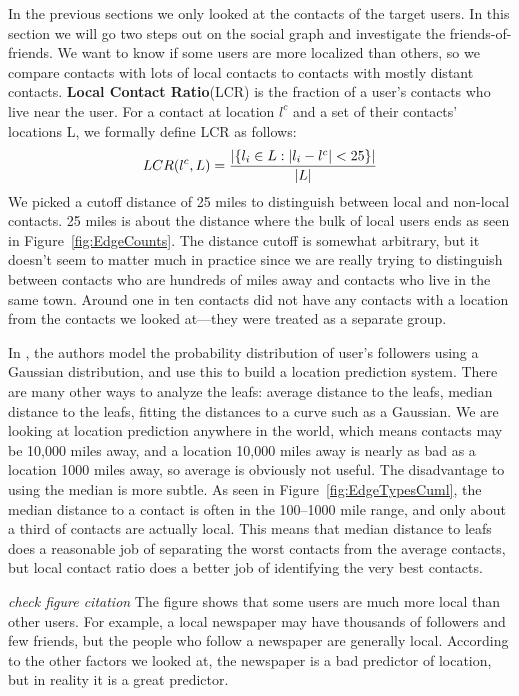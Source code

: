 \documentclass{sig-alternate}
\newcommand{\jam}[1]{\emph{#1}}
\begin{document}
In the previous sections we only looked at the contacts of the target
users.
%
In this section we will go two steps out on the social graph and
investigate the friends-of-friends.
%
We want to know if some users are more localized than others, so we compare
contacts with lots of local contacts to contacts with mostly distant contacts.
%
\textbf{Local Contact Ratio}(LCR) is the fraction of a user's contacts
who live near the user.
%
For a contact at location $l^c$ and a set of their contacts' locations L, we
formally define LCR as follows:
\[
    LCR(l^c,L) = { |\{ l_i \in L : |l_i-l^c|<25 \}|
                    \over |L| }
\]
%
We picked a cutoff distance of 25 miles to distinguish between local and non-local
contacts.
25 miles is about the distance where the bulk of local users ends as seen in
Figure~\ref{fig:EdgeCounts}.
%
The distance cutoff is somewhat arbitrary, but it doesn't seem to matter much
in practice since we are really trying to distinguish between contacts who are
hundreds of miles away and contacts who live in the same town.
%
Around one in ten contacts did not have any contacts with a location from the
contacts we looked at---they were treated as a separate group.

In \cite{li2012towards}, the authors model the probability distribution of
user's followers using a Gaussian distribution, and use this to build a
location prediction system.
%
There are many other ways to analyze the leafs: average distance to the leafs,
median distance to the leafs, fitting the distances to a curve such as a
Gaussian.
%
We are looking at location prediction anywhere in the world, which means
contacts may be 10,000 miles away, and a location 10,000 miles away is nearly
as bad as a location 1000 miles away, so average is obviously not useful.
%
The disadvantage to using the median is more subtle.
%
As seen in Figure~\ref{fig:EdgeTypesCuml}, the median distance to a contact is
often in the 100--1000 mile range, and only about a third of contacts are
actually local.
%
This means that median distance to leafs does a reasonable job of separating the
worst contacts from the average contacts, but local contact ratio does a better
job of identifying the very best contacts.

\jam{check figure citation}
%
The figure shows that some users are much more local than other users.
For example, a local newspaper may have thousands of followers and few friends,
but the people who follow a newspaper are generally local.
According to the other factors we looked at, the newspaper is a bad predictor
of location, but in reality it is a great predictor.
\end{document}
